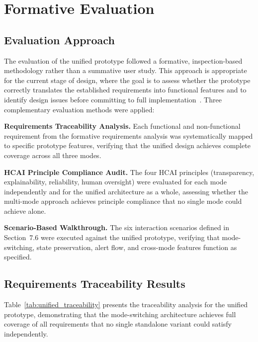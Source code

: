 \documentclass[sigconf]{acmart}
\begin{document}
\section{Formative Evaluation}

\subsection{Evaluation Approach}

The evaluation of the unified prototype followed a formative, inspection-based methodology rather than a summative user study. This approach is appropriate for the current stage of design, where the goal is to assess whether the prototype correctly translates the established requirements into functional features and to identify design issues before committing to full implementation~\cite{ref12, ref13}. Three complementary evaluation methods were applied:

\textbf{Requirements Traceability Analysis.} Each functional and non-functional requirement from the formative requirements analysis was systematically mapped to specific prototype features, verifying that the unified design achieves complete coverage across all three modes.

\textbf{HCAI Principle Compliance Audit.} The four HCAI principles (transparency, explainability, reliability, human oversight) were evaluated for each mode independently and for the unified architecture as a whole, assessing whether the multi-mode approach achieves principle compliance that no single mode could achieve alone.

\textbf{Scenario-Based Walkthrough.} The six interaction scenarios defined in Section~7.6 were executed against the unified prototype, verifying that mode-switching, state preservation, alert flow, and cross-mode features function as specified.

\subsection{Requirements Traceability Results}

Table~\ref{tab:unified_traceability} presents the traceability analysis for the unified prototype, demonstrating that the mode-switching architecture achieves full coverage of all requirements that no single standalone variant could satisfy independently.
\end{document}
